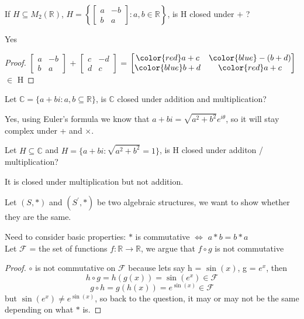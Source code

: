 \begin{exercise}
    If $H\subseteq M_{2}(\mathbb{R})$, $H = \left\{ \begin{bmatrix} a & -b \\ b & a \end{bmatrix} : a,b \in \mathbb{R} \right\}$, is H closed under $+$ ?
\end{exercise}
\begin{answer}
    Yes
\end{answer}
\begin{proof}[Proof]
    $\begin{bmatrix} a & -b \\ b & a \end{bmatrix}$ + 
    $\begin{bmatrix} c & -d \\ d & c \end{bmatrix}$ = 
    $\begin{bmatrix} \color{red}a+c & \color{blue}-(b+d) \\ \color{blue}b+d & \color{red}a+c \end{bmatrix}$ $\in$ H
\end{proof}

\begin{exercise}
    Let $\mathbb{C} = \{a+b\mathit{i} : a, b \subseteq \mathbb{R} \}$, is $\mathbb{C}$ closed under addition and multiplication?
\end{exercise}
\begin{answer}
    Yes, using Euler's formula we know that $a+b\mathit{i} = \sqrt{a^2+b^2} e^{i\theta}$, so it will stay complex under + and $\times$.
\end{answer}

\begin{exercise}
    Let $H \subseteq \mathbb{C}$ and $H = \{a+b\mathit{i} : \sqrt{a^2+b^2} = 1\}$, is H closed under additon / multiplication?
\end{exercise}
\begin{answer}
    It is closed under multiplication but not addition.
\end{answer}

\begin{eg}
    Let $(S, *)$ and $(S^\prime, *)$ be two algebraic structures, we want to show whether they are the same. 
    \begin{answer}
        Need to consider basic properties: $*$ is commutative $\iff$ $a*b=b*a$\\
        Let $\mathcal{F}$ = the set of functions $f: \mathbb{R} \rightarrow \mathbb{R}$, we argue that $f \circ g$  is not commutative
    \end{answer}
    \begin{proof}[Proof]
        $\circ$ is not commutative on $\mathcal{F}$ because lets say h = $\sin(x)$, g = $e^x$, then
        \[h \circ g = h(g(x)) = \sin(e^x) \in \mathcal{F}\]
        \[g \circ h = g(h(x)) = e^{\sin(x)} \in \mathcal{F}\]
        but $\sin(e^x) \neq e^{\sin(x)}$, so back to the question, it may or may not be the same depending on what $*$ is.
    \end{proof}
\end{eg}

